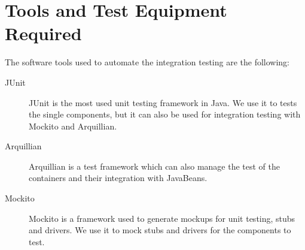 \section{Tools and Test Equipment Required}

The software tools used to automate the integration testing are the following:
\begin{description}
	
	\item[JUnit] JUnit is the most used unit testing framework in Java. We use it to tests the single components, but it can also be used for integration testing with Mockito and Arquillian.
	
	\item[Arquillian] Arquillian is a test framework which can also manage the test of the containers and their integration with JavaBeans.
	
	\item[Mockito] Mockito is a framework used to generate mockups for unit testing, stubs and drivers. We use it to mock stubs and drivers for the components to test.
	
\end{description}